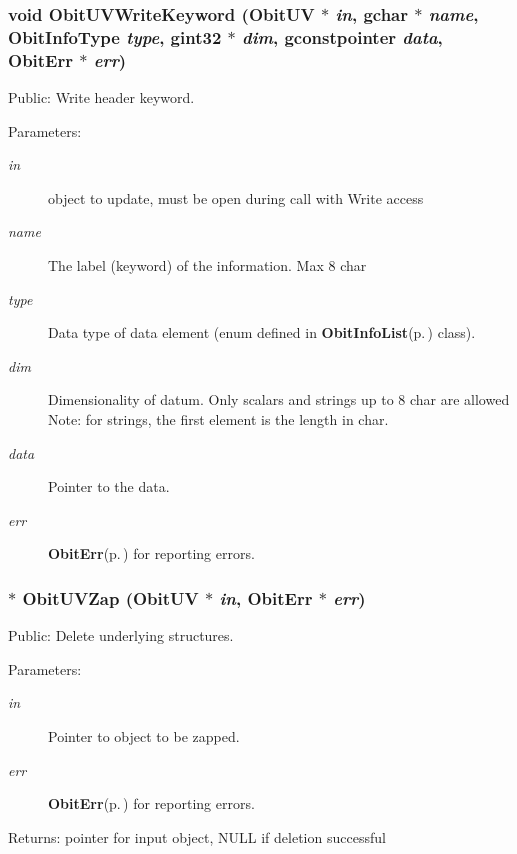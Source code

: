 \subsubsection{\setlength{\rightskip}{0pt plus 5cm}void Obit\-UVWrite\-Keyword ({\bf Obit\-UV} $\ast$ {\em in}, gchar $\ast$ {\em name}, Obit\-Info\-Type {\em type}, gint32 $\ast$ {\em dim}, gconstpointer {\em data}, {\bf Obit\-Err} $\ast$ {\em err})}\label{ObitUV_8h_a53}


Public: Write header keyword. 

\begin{Desc}
\item[Parameters:]
\begin{description}
\item[{\em in}]object to update, must be open during call with Write access \item[{\em name}]The label (keyword) of the information. Max 8 char \item[{\em type}]Data type of data element (enum defined in {\bf Obit\-Info\-List}{\rm (p.\,\pageref{structObitInfoList})} class). \item[{\em dim}]Dimensionality of datum. Only scalars and strings up to 8 char are allowed Note: for strings, the first element is the length in char. \item[{\em data}]Pointer to the data. \item[{\em err}]{\bf Obit\-Err}{\rm (p.\,\pageref{structObitErr})} for reporting errors. \end{description}
\end{Desc}
\subsubsection{$\ast$ Obit\-UVZap ({\bf Obit\-UV} $\ast$ {\em in}, {\bf Obit\-Err} $\ast$ {\em err})}\label{ObitUV_8h_a29}


Public: Delete underlying structures. 

\begin{Desc}
\item[Parameters:]
\begin{description}
\item[{\em in}]Pointer to object to be zapped. \item[{\em err}]{\bf Obit\-Err}{\rm (p.\,\pageref{structObitErr})} for reporting errors. \end{description}
\end{Desc}
\begin{Desc}
\item[Returns:]pointer for input object, NULL if deletion successful \end{Desc}

